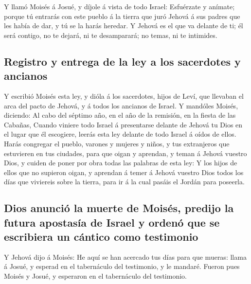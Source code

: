  Y llamó Moisés á Josué, y díjole á vista de todo Israel:
Esfuérzate y anímate; porque tú entrarás con este pueblo á la tierra que
juró Jehová á sus padres que les había de dar, y tú se la harás heredar.
 Y Jehová es el que va delante de ti; él será contigo, no te
dejará, ni te desamparará; no temas, ni te intimides.

\hypertarget{registro-y-entrega-de-la-ley-a-los-sacerdotes-y-ancianos}{%
\subsection{Registro y entrega de la ley a los sacerdotes y
ancianos}\label{registro-y-entrega-de-la-ley-a-los-sacerdotes-y-ancianos}}

 Y escribió Moisés esta ley, y dióla á los sacerdotes, hijos
de Leví, que llevaban el arca del pacto de Jehová, y á todos los
ancianos de Israel.  Y mandóles Moisés, diciendo: Al cabo
del séptimo año, en el año de la remisión, en la fiesta de las Cabañas,
 Cuando viniere todo Israel á presentarse delante de Jehová
tu Dios en el lugar que él escogiere, leerás esta ley delante de todo
Israel á oídos de ellos.  Harás congregar el pueblo,
varones y mujeres y niños, y tus extranjeros que estuvieren en tus
ciudades, para que oigan y aprendan, y teman á Jehová vuestro Dios, y
cuiden de poner por obra todas las palabras de esta ley:  Y
los hijos de ellos que no supieron oigan, y aprendan á temer á Jehová
vuestro Dios todos los días que viviereis sobre la tierra, para ir á la
cual pasáis el Jordán para poseerla.

\hypertarget{dios-anunciuxf3-la-muerte-de-moisuxe9s-predijo-la-futura-apostasuxeda-de-israel-y-ordenuxf3-que-se-escribiera-un-cuxe1ntico-como-testimonio}{%
\subsection{Dios anunció la muerte de Moisés, predijo la futura
apostasía de Israel y ordenó que se escribiera un cántico como
testimonio}\label{dios-anunciuxf3-la-muerte-de-moisuxe9s-predijo-la-futura-apostasuxeda-de-israel-y-ordenuxf3-que-se-escribiera-un-cuxe1ntico-como-testimonio}}

 Y Jehová dijo á Moisés: He aquí se han acercado tus días
para que mueras: llama á Josué, y esperad en el tabernáculo del
testimonio, y le mandaré. Fueron pues Moisés y Josué, y esperaron en el
tabernáculo del testimonio.

